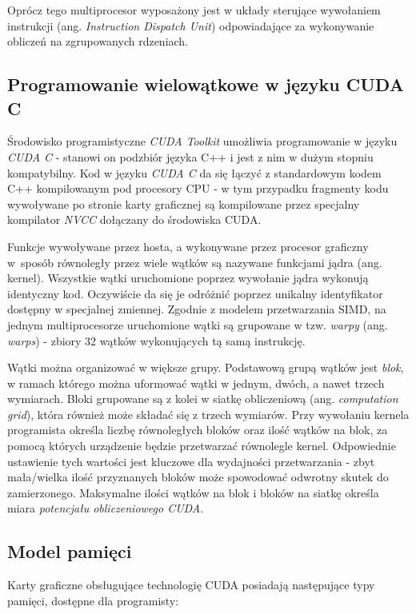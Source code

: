 \documentclass[12pt]{article}
\begin{document}
Oprócz tego multiprocesor wyposażony jest w układy sterujące wywołaniem instrukcji (ang. \textit{Instruction Dispatch Unit}) odpowiadające za wykonywanie obliczeń na zgrupowanych rdzeniach.

\subsection{Programowanie wielowątkowe w języku CUDA C}

Środowisko programistyczne \textit{CUDA Toolkit} umożliwia programowanie w języku \textit{CUDA C} - stanowi on podzbiór języka C++ i jest z nim w dużym stopniu kompatybilny. Kod w języku \textit{CUDA C} da się łączyć z standardowym kodem C++ kompilowanym pod procesory CPU - w tym przypadku fragmenty kodu wywoływane po stronie karty graficznej są kompilowane przez specjalny kompilator \textit{NVCC} dołączany do środowiska CUDA. 

Funkcje wywoływane przez hosta, a wykonywane przez procesor graficzny w~sposób równoległy przez wiele wątków są nazywane funkcjami jądra (ang. kernel). Wszystkie wątki uruchomione poprzez wywołanie jądra wykonują identyczny kod. Oczywiście da się je odróżnić poprzez unikalny identyfikator dostępny w specjalnej zmiennej. Zgodnie z modelem przetwarzania SIMD, na jednym multiprocesorze uruchomione wątki są grupowane w tzw. \textit{warpy} (ang. \textit{warps}) - zbiory 32 wątków wykonujących tą samą instrukcję. 

Wątki można organizować w większe grupy. Podstawową grupą wątków jest \textit{blok}, w ramach którego można uformować wątki w jednym, dwóch, a nawet trzech wymiarach. Bloki grupowane są z kolei w siatkę obliczeniową (ang. \textit{computation grid}), która również może składać się z trzech wymiarów. Przy wywołaniu kernela programista określa liczbę równoległych bloków oraz ilość wątków na blok, za pomocą których urządzenie będzie przetwarzać równolegle kernel. Odpowiednie ustawienie tych wartości jest kluczowe dla wydajności przetwarzania - zbyt mała/wielka ilość przyznanych bloków może spowodować odwrotny skutek do zamierzonego. Maksymalne ilości wątków na blok i bloków na siatkę określa miara \textit{potencjału obliczeniowego CUDA}. 

\subsection{Model pamięci}

Karty graficzne obsługujące technologię CUDA posiadają następujące typy pamięci, dostępne dla programisty:
\end{document}
